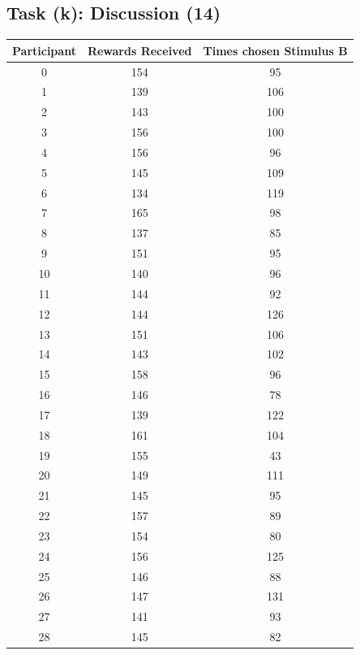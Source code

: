\documentclass{article}
\begin{document}
\subsection{Task (k): Discussion (14)}


\printbibliography

\begin{appendices}
  
  \begin{table}
    \centering
    \begin{tabular}{ccc}
      \toprule
      Participant &    Rewards Received &    Times chosen Stimulus B \\
      \midrule
      0  &  154 &   95 \\
      1  &  139 &  106 \\
      2  &  143 &  100 \\
      3  &  156 &  100 \\
      4  &  156 &   96 \\
      5  &  145 &  109 \\
      6  &  134 &  119 \\
      7  &  165 &   98 \\
      8  &  137 &   85 \\
      9  &  151 &   95 \\
      10 &  140 &   96 \\
      11 &  144 &   92 \\
      12 &  144 &  126 \\
      13 &  151 &  106 \\
      14 &  143 &  102 \\
      15 &  158 &   96 \\
      16 &  146 &   78 \\
      17 &  139 &  122 \\
      18 &  161 &  104 \\
      19 &  155 &   43 \\
      20 &  149 &  111 \\
      21 &  145 &   95 \\
      22 &  157 &   89 \\
      23 &  154 &   80 \\
      24 &  156 &  125 \\
      25 &  146 &   88 \\
      26 &  147 &  131 \\
      27 &  141 &   93 \\
      28 &  145 &   82 \\

\end{tabular}
\end{table}
\end{appendices}
\end{document}
